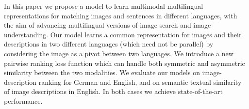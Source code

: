 In this paper we propose a model to learn multimodal multilingual representations for matching images and sentences in different languages, with the aim of advancing multilingual versions of image search and image understanding. Our model learns a common representation for images and their descriptions in two different languages (which need not be parallel) by considering the image as a pivot between two languages. We introduce a new pairwise ranking loss function which can handle both symmetric and asymmetric similarity between the two modalities. We evaluate our models on image-description ranking for German and English, and on semantic textual similarity of image descriptions in English. In both cases we achieve state-of-the-art performance.

